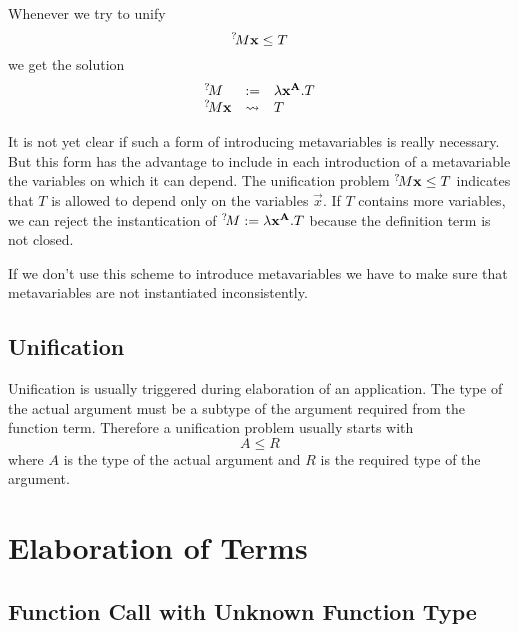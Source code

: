 Whenever we try to unify
$$
    \meta{M} \vec{x} \le T
$$
we get the solution
$$
\begin{array}{lll}
    \meta{M} &:=& \lambda \vec{x}^{\vec{A}}. T

    \\

    \meta{M} \vec{x} &\leadsto& T
\end{array}
$$

It is not yet clear if such a form of introducing metavariables is really
necessary. But this form has the advantage to include in each introduction of a
metavariable the variables on which it can depend. The unification problem
${}^?\!M \mathbf{x} \le T$ indicates that $T$ is allowed to depend only on the
variables $\vec{x}$. If $T$ contains more variables, we can reject the
instantication of ${}^?\!M := \lambda \mathbf{x}^{\mathbf{A}}. T$ because the
definition term is not closed.

If we don't use this scheme to introduce metavariables we have to make sure that
metavariables are not instantiated inconsistently.




\subsection{Unification}

Unification is usually triggered during elaboration of an application. The type
of the actual argument must be a subtype of the argument required from the
function term. Therefore a unification problem usually starts with
$$
    A \le R
$$
where $A$ is the type of the actual argument and $R$ is the required type of the
argument.















\section{Elaboration of Terms}





\subsection{Function Call with Unknown Function Type}


